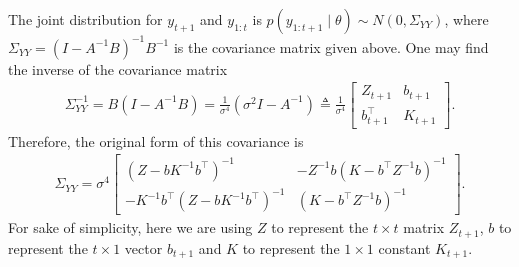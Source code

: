 The joint distribution for $y_{t+1}$ and $y_{1:t}$ is $p(y_{1:t+1}\mid \theta)\sim N(0,\Sigma_{YY})$, where $\Sigma_{YY} = (I-A^{-1}B)^{-1}B^{-1}$ is the covariance matrix given above. One may find the inverse of the covariance matrix 
\begin{align*}
\Sigma_{YY}^{-1} = B(I-A^{-1}B) =\frac{1}{\sigma^4}(\sigma^2 I-A^{-1}) \triangleq \frac{1}{\sigma^4} \left[\begin{matrix} 
Z_{t+1} & b_{t+1} \\
b_{t+1}^\top & K_{t+1}
\end{matrix} \right].
\end{align*}
Therefore, the original form of this covariance is 
\begin{align*} \Sigma_{YY} =\sigma^4 \left[ \begin{matrix}
(Z-bK^{-1}b^\top)^{-1} & -Z^{-1}b(K-b^\top Z^{-1}b)^{-1}\\
-K^{-1}b^\top (Z-bK^{-1}b^\top)^{-1} & (K-b^\top Z^{-1}b)^{-1}
\end{matrix}\right].
\end{align*}
For sake of simplicity, here we are using $Z$ to represent the $t\times t$ matrix $Z_{t+1}$, $b$ to represent the $t \times 1$ vector  $b_{t+1}$  and $K$ to represent the $1\times 1$ constant $K_{t+1}$. 


